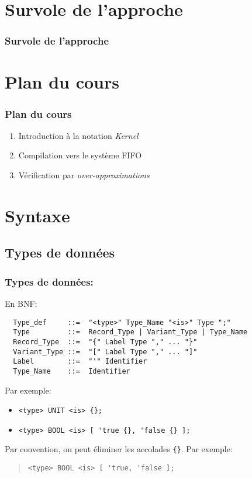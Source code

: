 \documentclass{beamer}
\newcommand{\Kernel}{\textit{Kernel}}
\begin{document}
\section{Survole de l'approche}

\begin{frame} 
  \frametitle{Survole de l'approche}
  \begin{center}
    
  \end{center}
\end{frame}

\section{Plan du cours}

\begin{frame} 
  \frametitle{Plan du cours}
  \begin{enumerate}
  \item Introduction à la notation \Kernel{} 
  \item Compilation vers le système FIFO 
  \item Vérification par \emph{over-approximations} 
  \end{enumerate}

  \hfill 
\end{frame}




\section{Syntaxe}

\subsection{Types de données}

\begin{frame}[fragile]
  \frametitle{Types de données:}

  En BNF:
  {\footnotesize\color{red}
\begin{verbatim}
  Type_def     ::=  "<type>" Type_Name "<is>" Type ";"
  Type         ::=  Record_Type | Variant_Type | Type_Name
  Record_Type  ::=  "{" Label Type "," ... "}"
  Variant_Type ::=  "[" Label Type "," ... "]"
  Label        ::=  "'" Identifier 
  Type_Name    ::=  Identifier
\end{verbatim} 
  }
    
  Par exemple:{\footnotesize
    \begin{itemize}
    \item[] \color{blue}\verb+<type> UNIT <is> {}; +
    \item[] \color{blue}\verb+<type> BOOL <is> [ 'true {}, 'false {} ]; +
    \end{itemize}
  }
  
  Par convention, on peut éliminer les accolades \verb+{}+. Par exemple:
  \begin{quote} \footnotesize
    \color{blue}\verb+<type> BOOL <is> [ 'true, 'false ]; +
  \end{quote}
  
  
\end{frame}
\end{document}
